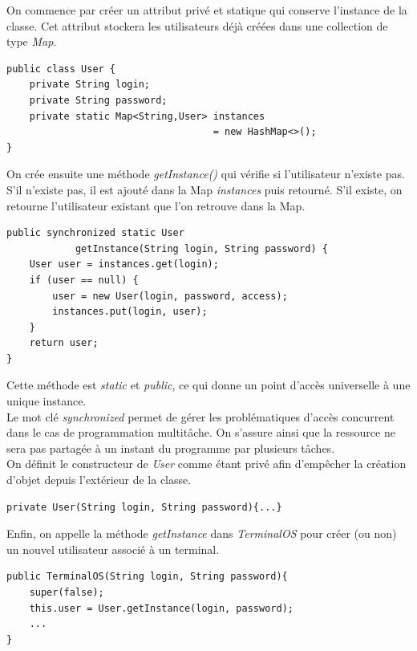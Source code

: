 On commence par créer un attribut privé et statique qui conserve l’instance de la classe. Cet attribut stockera les utilisateurs déjà créées dans une collection de type \emph{Map}.
\clearpage
\begin{lstlisting}
public class User {
	private String login;
	private String password;
	private static Map<String,User> instances 
									= new HashMap<>();
}
\end{lstlisting}

On crée ensuite une méthode \emph{getInstance()} qui vérifie si l’utilisateur n'existe pas. S'il
n'existe pas, il est ajouté dans la Map \emph{instances} puis retourné. S’il existe, on retourne l’utilisateur existant
que l’on retrouve dans la Map.

\begin{lstlisting}
public synchronized static User 
			getInstance(String login, String password) {
    User user = instances.get(login);
    if (user == null) {
        user = new User(login, password, access);
        instances.put(login, user);
    }
    return user;
}
\end{lstlisting}

Cette méthode est \emph{static} et \emph{public}, ce qui donne un point d'accès universelle à une unique instance.\\

Le mot clé \emph{synchronized} permet de gérer les problématiques d'accès concurrent dans le cas de programmation multitâche. On s'assure ainsi que la ressource ne sera pas partagée à un instant du programme par plusieurs tâches.\\

On définit le constructeur de \emph{User} comme étant privé afin
d’empêcher la création d’objet depuis l’extérieur de la classe.

\begin{lstlisting}
private User(String login, String password){...}
\end{lstlisting}

Enfin, on appelle la méthode \emph{getInstance} dans \emph{TerminalOS} pour créer (ou non) un
nouvel utilisateur associé à un terminal.

\begin{lstlisting}
public TerminalOS(String login, String password){
	super(false);
	this.user = User.getInstance(login, password);
	...
}
\end{lstlisting}

